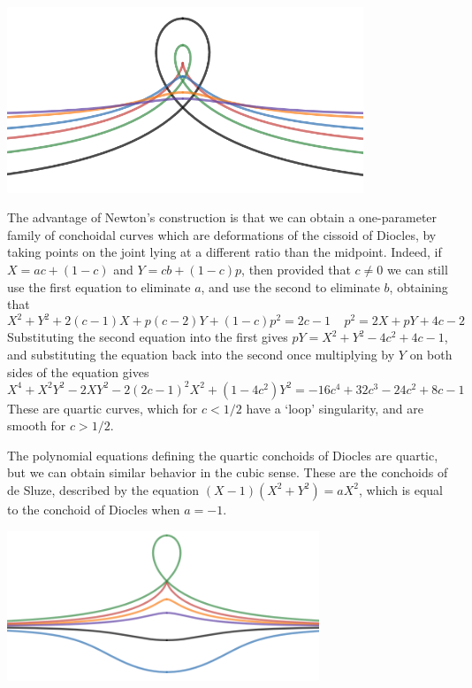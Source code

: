\begin{example}
    \begin{center}
        \includegraphics[width=0.8\textwidth]{algebraicGeometryConchoidDiocles2}
    \end{center}

    The advantage of Newton's construction is that we can obtain a one-parameter family of conchoidal curves which are deformations of the cissoid of Diocles, by taking points on the joint lying at a different ratio than the midpoint. Indeed, if $X = ac + (1 - c)$ and $Y = cb + (1-c)p$, then provided that $c \neq 0$ we can still use the first equation to eliminate $a$, and use the second to  eliminate $b$, obtaining that
    \[ X^2 + Y^2 + 2(c-1)X + p(c-2)Y + (1 - c)p^2 = 2c - 1\ \ \ \ \  p^2 = 2X + pY + 4c - 2 \]
    Substituting the second equation into the first gives $pY = X^2 + Y^2 - 4c^2 + 4c - 1$, and substituting the equation back into the second once multiplying by $Y$ on both sides of the equation gives
    \[ X^4 + X^2Y^2  - 2XY^2 - 2(2c-1)^2X^2 + (1 - 4c^2)Y^2 = -16c^4 + 32c^3 - 24c^2 + 8c - 1 \]
    These are quartic curves, which for $c < 1/2$ have a `loop' singularity, and are smooth for $c > 1/2$.
\end{example}

\begin{example}
    The polynomial equations defining the quartic conchoids of Diocles are quartic, but we can obtain similar behavior in the cubic sense. These are the conchoids of de Sluze, described by the equation $(X-1)(X^2 + Y^2) = aX^2$, which is equal to the conchoid of Diocles when $a = -1$.

    \begin{center}
        \includegraphics[width=0.7\textwidth]{algebraicGeometryConchoidDesluze}
    \end{center}
\end{example}

